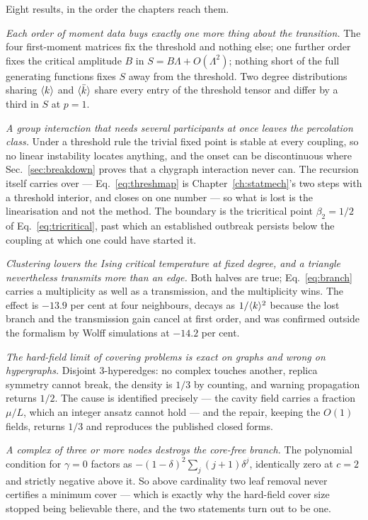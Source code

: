 Eight results, in the order the chapters reach them.

\emph{Each order of moment data buys exactly one more thing about the
transition.} The four first-moment matrices fix the threshold and nothing else;
one further order fixes the critical amplitude $B$ in $S=B\Lambda+O(\Lambda^{2})$;
nothing short of the full generating functions fixes $S$ away from the
threshold. Two degree distributions sharing $\langle k \rangle$ and $\langle \bar k \rangle$ share
every entry of the threshold tensor and differ by a third in $S$ at $p=1$.

\emph{A group interaction that needs several participants at once leaves the
percolation class.} Under a threshold rule the trivial fixed point is stable at
every coupling, so no linear instability locates anything, and the onset can be
discontinuous where Sec.~\ref{sec:breakdown} proves that a chygraph interaction
never can. The recursion itself carries over --- Eq.~\eqref{eq:threshmap} is
Chapter~\ref{ch:statmech}'s two steps with a threshold interior, and closes on
one number --- so what is lost is the linearisation and not the method. The
boundary is the tricritical point $\beta_{2}=1/2$ of
Eq.~\eqref{eq:tricritical}, past which an established outbreak persists below
the coupling at which one could have started it.

\emph{Clustering lowers the Ising critical temperature at fixed degree, and a
triangle nevertheless transmits more than an edge.} Both halves are true;
Eq.~\eqref{eq:branch} carries a multiplicity as well as a transmission, and the
multiplicity wins. The effect is $-13.9$ per cent at four neighbours, decays as
$1/\langle k \rangle^{2}$ because the lost branch and the transmission gain cancel at
first order, and was confirmed outside the formalism by Wolff simulations at
$-14.2$ per cent.

\emph{The hard-field limit of covering problems is exact on graphs and wrong on
hypergraphs.} Disjoint $3$-hyperedges: no complex touches another, replica
symmetry cannot break, the density is $1/3$ by counting, and warning propagation
returns $1/2$. The cause is identified precisely --- the cavity field carries a
fraction $\mu/L$, which an integer ansatz cannot hold --- and the repair,
keeping the $O(1)$ fields, returns $1/3$ and reproduces the published closed
forms.

\emph{A complex of three or more nodes destroys the core-free branch.} The
polynomial condition for $\gamma=0$ factors as
$-(1-\delta)^{2}\sum_{j}(j+1)\delta^{j}$, identically zero at $c=2$ and strictly
negative above it. So above cardinality two leaf removal never certifies a
minimum cover --- which is exactly why the hard-field cover size stopped being
believable there, and the two statements turn out to be one.

